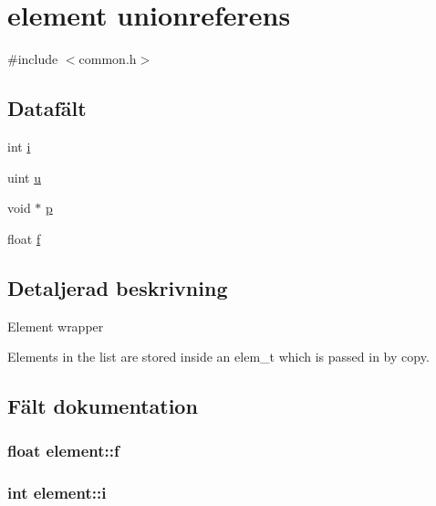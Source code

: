 \hypertarget{unionelement}{}\section{element unionreferens}
\label{unionelement}


{\ttfamily \#include $<$common.\+h$>$}

\subsection*{Datafält}
\begin{DoxyCompactItemize}
\item 
int \hyperlink{unionelement_a4e41a1440036146f7a3c50c07a91e7fe}{i}
\item 
uint \hyperlink{unionelement_abd4034f37eb6d6ecdda71c9102680902}{u}
\item 
void $\ast$ \hyperlink{unionelement_a075c65aee9ffc316eb213e9d0606e0b9}{p}
\item 
float \hyperlink{unionelement_a8cf2d86c582a0e86d5f1ee1e4f62816b}{f}
\end{DoxyCompactItemize}


\subsection{Detaljerad beskrivning}
Element wrapper

Elements in the list are stored inside an elem\+\_\+t which is passed in by copy. 

\subsection{Fält dokumentation}
\subsubsection[{\texorpdfstring{f}{f}}]{\setlength{\rightskip}{0pt plus 5cm}float element\+::f}\hypertarget{unionelement_a8cf2d86c582a0e86d5f1ee1e4f62816b}{}\label{unionelement_a8cf2d86c582a0e86d5f1ee1e4f62816b}
\subsubsection[{\texorpdfstring{i}{i}}]{\setlength{\rightskip}{0pt plus 5cm}int element\+::i}\hypertarget{unionelement_a4e41a1440036146f7a3c50c07a91e7fe}{}\label{unionelement_a4e41a1440036146f7a3c50c07a91e7fe}
